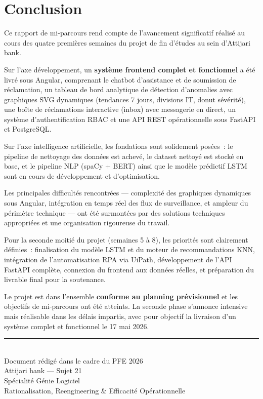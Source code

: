 \documentclass[12pt,a4paper]{report}
\begin{document}
\chapter{Conclusion}

Ce rapport de mi-parcours rend compte de l'avancement significatif réalisé au cours des quatre premières semaines du projet de fin d'études au sein d'Attijari bank.

Sur l'axe développement, un \textbf{système frontend complet et fonctionnel} a été livré sous Angular, comprenant le chatbot d'assistance et de soumission de réclamation, un tableau de bord analytique de détection d'anomalies avec graphiques SVG dynamiques (tendances 7 jours, divisions IT, donut sévérité), une boîte de réclamations interactive (inbox) avec messagerie en direct, un système d'authentification RBAC et une API REST opérationnelle sous FastAPI et PostgreSQL.

Sur l'axe intelligence artificielle, les fondations sont solidement posées~: le pipeline de nettoyage des données est achevé, le dataset nettoyé est stocké en base, et le pipeline NLP (spaCy + BERT) ainsi que le modèle prédictif LSTM sont en cours de développement et d'optimisation.

Les principales difficultés rencontrées --- complexité des graphiques dynamiques sous Angular, intégration en temps réel des flux de surveillance, et ampleur du périmètre technique --- ont été surmontées par des solutions techniques appropriées et une organisation rigoureuse du travail.

Pour la seconde moitié du projet (semaines 5 à 8), les priorités sont clairement définies~: finalisation du modèle LSTM et du moteur de recommandations KNN, intégration de l'automatisation RPA via UiPath, développement de l'API FastAPI complète, connexion du frontend aux données réelles, et préparation du livrable final pour la soutenance.

Le projet est dans l'ensemble \textbf{conforme au planning prévisionnel} et les objectifs de mi-parcours ont été atteints. La seconde phase s'annonce intensive mais réalisable dans les délais impartis, avec pour objectif la livraison d'un système complet et fonctionnel le 17 mai 2026.

\vspace{1cm}
\begin{center}
\rule{0.5\textwidth}{0.4pt}\\[0.3cm]
{\small\textcolor{attijariGray}{Document rédigé dans le cadre du PFE 2026}}\\
{\small\textcolor{attijariGray}{Attijari bank --- Sujet 21}}\\
{\small\textcolor{attijariGray}{Spécialité Génie Logiciel}}\\
{\small\textcolor{attijariGray}{Rationalisation, Reengineering \& Efficacité Opérationnelle}}
\end{center}
\end{document}
